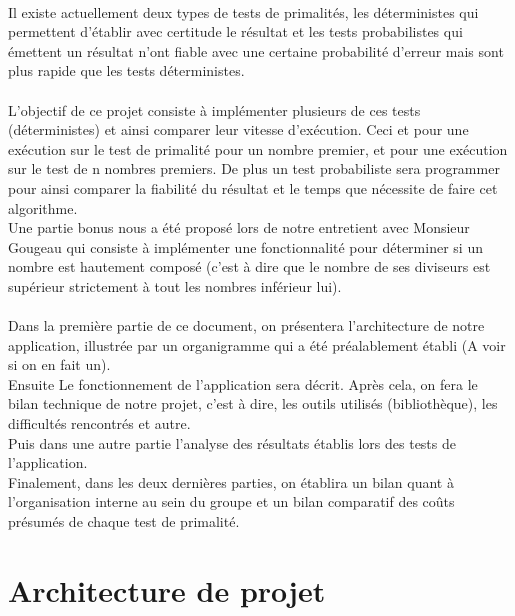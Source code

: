 	\paragraph{}Il existe actuellement deux types de tests de primalités, les déterministes qui permettent d'établir avec certitude le résultat et les tests probabilistes qui émettent un résultat n'ont fiable avec une certaine probabilité d'erreur mais sont plus rapide que les tests déterministes.
	
	\paragraph{}L'objectif de ce projet consiste à implémenter plusieurs de ces tests (déterministes) et ainsi comparer leur vitesse  d'exécution. Ceci et pour une exécution sur le test de primalité pour un nombre premier, et pour une exécution sur le test de n nombres premiers. De plus un test probabiliste sera programmer pour ainsi comparer la fiabilité du résultat et le temps que nécessite de faire cet algorithme.\\ 
	Une partie bonus nous a été proposé lors de notre entretient avec Monsieur Gougeau qui consiste à implémenter une fonctionnalité pour déterminer si un nombre est hautement composé (c'est à dire que le nombre de ses diviseurs est supérieur strictement à tout les nombres inférieur lui). 
	
	\paragraph{}Dans la première partie de ce document, on présentera l'architecture de notre application, illustrée par un organigramme qui a été préalablement établi (A voir si on en fait un).\\
	Ensuite Le fonctionnement de l'application sera décrit.
	Après cela, on fera le bilan technique de notre projet, c'est à dire, les outils utilisés (bibliothèque), les difficultés rencontrés et autre.\\
	Puis dans une autre partie l'analyse des résultats établis lors des tests de l'application.\\
	Finalement, dans les deux dernières parties, on établira un bilan quant à l'organisation interne au sein du groupe et un bilan comparatif des coûts présumés de chaque test de primalité.
	
		
	\section{Architecture de projet}
